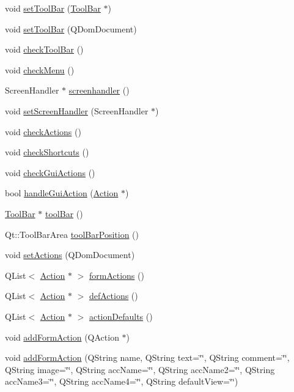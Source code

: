 \begin{DoxyCompactItemize}
\item 
void \hyperlink{classFglForm_acf0280c2e7ca7d56bc45c822b8fb9468}{setToolBar} (\hyperlink{classToolBar}{ToolBar} $\ast$)
\item 
void \hyperlink{classFglForm_ad139148f573546a3ef5ead0f49170d08}{setToolBar} (QDomDocument)
\item 
void \hyperlink{classFglForm_a7490e381d17c7644c7f37a58d5ffa9b4}{checkToolBar} ()
\item 
void \hyperlink{classFglForm_ab7d3ed99ee7eac4b6b781e576d33a1ea}{checkMenu} ()
\item 
ScreenHandler $\ast$ \hyperlink{classFglForm_aebb86e0bc590b730ff490b030b5dba7c}{screenhandler} ()
\item 
void \hyperlink{classFglForm_aba5859f32918808eb18606b85483a4c6}{setScreenHandler} (ScreenHandler $\ast$)
\item 
void \hyperlink{classFglForm_ad806af9cecf975dc4abe1e12eb52864a}{checkActions} ()
\item 
void \hyperlink{classFglForm_a3770f9b34c38cb5bc3f66a7e388c43ce}{checkShortcuts} ()
\item 
void \hyperlink{classFglForm_a60718980fe99888336db588976319382}{checkGuiActions} ()
\item 
bool \hyperlink{classFglForm_ab44742db0c6d0d2e0663db22c9668b4c}{handleGuiAction} (\hyperlink{classAction}{Action} $\ast$)
\item 
\hyperlink{classToolBar}{ToolBar} $\ast$ \hyperlink{classFglForm_ae474767d66111cda958e191e6be1e34d}{toolBar} ()
\item 
Qt::ToolBarArea \hyperlink{classFglForm_acca25b6cbf4161c7075fb594a556eb9a}{toolBarPosition} ()
\item 
void \hyperlink{classFglForm_a4b9c2e9963530fba9dc68f9dae0928a0}{setActions} (QDomDocument)
\item 
QList$<$ \hyperlink{classAction}{Action} $\ast$ $>$ \hyperlink{classFglForm_ac8a66ae6b84ca24c622a87eb631a4834}{formActions} ()
\item 
QList$<$ \hyperlink{classAction}{Action} $\ast$ $>$ \hyperlink{classFglForm_a1a92c94c67dd0ff9d8ff48c3fc64dcf9}{defActions} ()
\item 
QList$<$ \hyperlink{classAction}{Action} $\ast$ $>$ \hyperlink{classFglForm_aa65ef0a575b40217c5fbbe71c6faaf28}{actionDefaults} ()
\item 
void \hyperlink{classFglForm_ac43c7da12a298a241c7c98cf9a688a6f}{addFormAction} (QAction $\ast$)
\item 
void \hyperlink{classFglForm_a21e61578024f5922c949b4c2870684d4}{addFormAction} (QString name, QString text=\char`\"{}\char`\"{}, QString comment=\char`\"{}\char`\"{}, QString image=\char`\"{}\char`\"{}, QString accName=\char`\"{}\char`\"{}, QString accName2=\char`\"{}\char`\"{}, QString accName3=\char`\"{}\char`\"{}, QString accName4=\char`\"{}\char`\"{}, QString defaultView=\char`\"{}\char`\"{})

\end{DoxyCompactItemize}
